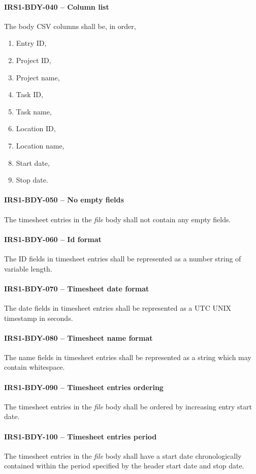 \paragraph{IRS1-BDY-040 -- Column list}
The body \gls{CSV} columns shall be, in order,
\begin{enumerate}
\item Entry ID,
\item Project ID,
\item Project name,
\item Task ID,
\item Task name,
\item Location ID,
\item Location name,
\item Start date,
\item Stop date.
\end{enumerate}

\paragraph{IRS1-BDY-050 -- No empty fields}
The timesheet entries in the \emph{file} body shall not contain any empty
fields.

\paragraph{IRS1-BDY-060 -- Id format}
The ID fields in timesheet entries shall be represented as a number string
of variable length.

\paragraph{IRS1-BDY-070 -- Timesheet date format}
The date fields in timesheet entries shall be represented as a \gls{UTC}
UNIX timestamp in seconds.

\paragraph{IRS1-BDY-080 -- Timesheet name format}
The name fields in timesheet entries shall be represented as a string
which may contain whitespace.

\paragraph{IRS1-BDY-090 -- Timesheet entries ordering}
The timesheet entries in the \emph{file} body shall be ordered by
increasing entry start date.

\paragraph{IRS1-BDY-100 -- Timesheet entries period}
The timesheet entries in the \emph{file} body shall have a
start date chronologically contained within the period specified
by the header start date and stop date.
